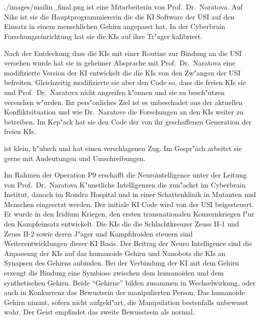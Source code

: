 \newpage
\section[Mailin]{\ml{}}

\begin{sideimagebox}[r]{0.6}{./images/mailin_final.png}{\ml}
    \ml{} ist eine Mitarbeiterin von Prof.~Dr.~Naratova. Auf Nike ist sie die Hauptprogrammiererin die die KI Software der USI auf den Einsatz in einem menschlichen Gehirn angepasst hat.  In der Cyberbrain Forschungseinrichtung hat sie die KIs auf ihre Tr"ager kalibriert.

    Nach der Entdeckung dass die KIs mit einer Routine zur Bindung an die USI versehen wurde hat sie in geheimer Absprache mit Prof.~Dr.~Naratova eine modifizierte Version der KI entwickelt die die KIs von den Zw"angen der USI befreiten. Gleichzeitig modifizierte sie aber den Code so, dass die freien KIs sie und Prof.~Dr.~Naratova nicht angreifen k"onnen und sie zu besch"utzen versuchen w"urden. Ihr pers"onliches Ziel ist es unbeschadet aus der aktuellen Konfliktsituation und wie Dr.~Naratove die Forschungen an den KIs weiter zu betreiben. Im Kep"ack hat sie den Code der von ihr geschaffenen Generation der freien KIs.

    \ml{} ist klein, h"ubsch und hat einen verschlagenen Zug. Im Gespr"ach arbeitet sie gerne mit Andeutungen und Umschreibungen.
\end{sideimagebox}


Im Rahmen der Operation P9 erschafft die Neurointelligence unter der Leitung von Prof.~Dr.~Naratova K"unstliche Intelligenzen die zun"achst im Cyberbrain Institut, danach im Rondra Hospital und in einer Schattenklinik in Mutanten und Menschen eingesetzt werden. Der initiale KI Code wird von der USI beigesteuert. Er wurde in den Iridium Kriegen, den ersten transnationalen Konzernkriegen f"ur den Kampfeinsatz entwickelt. Die KIs die die Schlachtkreuzer Zeuss II-1 und Zeuss II-2 sowie deren J"ager und Kampfdroiden steuern sind Weiterentwicklungen dieser KI Basis. Der Beitrag der Neuro Intelligence sind die Anpassung der KIs auf das humanoide Gehirn und Nanobots die KIs an Synapsen  des Gehirns anbinden. Bei der Verbindung der KI mit dem Gehirn erzeugt die Bindung eine Symbiose zwischen dem humanoiden und dem synthetischen Gehirn. Beide "`Gehirne"' bilden zusammen in Wechselwirkung, oder auch in Konkurrenz das Bewustsein der manipulierten Person. Das humanoide Gehirn nimmt, sofern nicht aufgekl"art, die Manipulation bestenfalls unbewusst wahr. Der Geist empfindet das zweite Bewusstsein als normal.

